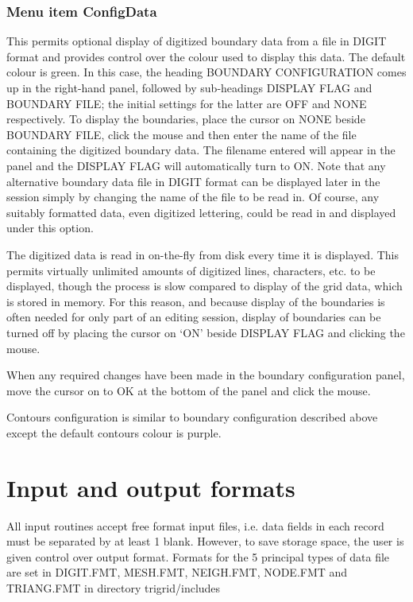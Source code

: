 \documentclass{article}
\begin{document}
\subsubsection[Menu item ConfigData]{Menu item ConfigData}
This permits optional display of digitized boundary data from a file in DIGIT format and provides control over the colour used to display this data. The default colour is green. In this case, the heading BOUNDARY CONFIGURATION comes up in the right-hand panel, followed by sub-headings DISPLAY FLAG and BOUNDARY FILE; the initial settings for the latter are OFF and NONE respectively. To display the boundaries, place the cursor on NONE beside BOUNDARY FILE, click the mouse and then enter the name of the file containing the digitized boundary data. The filename entered will appear in the panel and the DISPLAY FLAG will automatically turn to ON. Note that any alternative boundary data file in DIGIT format can be displayed later in the session simply by changing the name of the file to be read in. Of course, any suitably formatted data, even digitized lettering, could be read in and displayed under this option.

The digitized data is read in {\textquotedbl}on-the-fly{\textquotedbl} from disk every time it is displayed. This permits virtually unlimited amounts of digitized lines, characters, etc. to be displayed, though the process is slow compared to display of the grid data, which is stored in memory. For this reason, and because display of the boundaries is often needed for only part of an editing session, display of boundaries can be turned off by placing the cursor on `ON' beside DISPLAY FLAG and clicking the mouse.

When any required changes have been made in the boundary configuration panel, move the cursor on to OK at the bottom of the panel and click the mouse.

Contours configuration is similar to boundary configuration described above except the default contours colour is purple.



\section{Input and output formats} \label{sec:formats}
All input routines accept free format input files, i.e. data fields in each record must be separated by at least 1 blank. However, to save storage space, the user is given control over output format. Formats for the 5 principal types of data file are set in DIGIT.FMT, MESH.FMT, NEIGH.FMT, NODE.FMT and TRIANG.FMT in directory trigrid/includes
\end{document}
